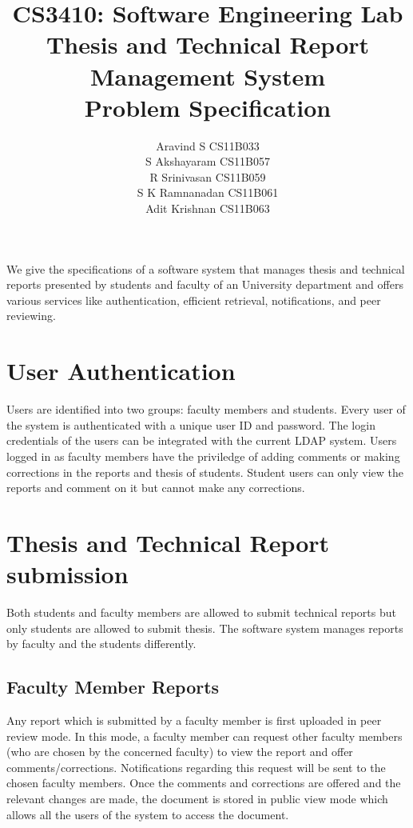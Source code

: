 \documentclass{article}
\begin{document}
\title{\textbf{CS3410: Software Engineering Lab}
\\
\textbf{Thesis and Technical Report Management System\\Problem Specification}}
\author{ Aravind S CS11B033 \\
		 S Akshayaram CS11B057\\
		 R Srinivasan CS11B059\\
		 S K Ramnanadan CS11B061\\
		 Adit Krishnan  CS11B063\\
[0.2in]
}

\maketitle

We give the specifications of a software system that manages thesis and technical reports presented by students and faculty of an University department and offers various services like authentication, efficient retrieval, notifications, and peer reviewing. 

\section{User Authentication}

Users are identified into two groups: faculty members and students. Every user of the system is authenticated with a unique user ID and password. The login credentials of the users can be integrated with the current LDAP system. Users logged in as faculty members have the priviledge of adding comments or making corrections in the reports and thesis of students. Student users can only view the reports and comment on it but cannot make any corrections.

\section{Thesis and Technical Report submission}

Both students and faculty members are allowed to submit technical reports but only students are allowed to submit thesis. The software system manages reports by faculty and the students differently.
\subsection{Faculty Member Reports}

Any report which is submitted by a faculty member is first uploaded in peer review mode. In this mode, a faculty member can request other faculty members (who are chosen by the concerned faculty) to view the report and offer comments/corrections. Notifications regarding this request will be sent to the chosen faculty members. Once the comments and corrections are offered and the relevant changes are made, the document is stored in public view mode which allows all the users of the system to access the document.
\end{document}
